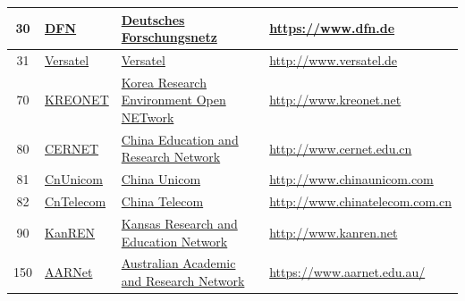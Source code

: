 \begin{small}
\begin{center}
\begin{longtable}{|c|c|c|c|}
 30 & \multicolumn{1}{|l|}{\index{DFN|see{Deutsches Forschungsnetz}}\index{Provider!Deutsches Forschungsnetz}\href{https://www.dfn.de}{DFN}} & \multicolumn{1}{|l|}{\index{Deutsches Forschungsnetz}\href{https://www.dfn.de}{Deutsches Forschungsnetz}} & \multicolumn{1}{|l|}{\tiny{\url{https://www.dfn.de}}} \\ \hline
 31 & \multicolumn{1}{|l|}{\index{Versatel}\index{Provider!Versatel}\href{http://www.versatel.de}{Versatel}} & \multicolumn{1}{|l|}{\index{Versatel}\href{http://www.versatel.de}{Versatel}} & \multicolumn{1}{|l|}{\tiny{\url{http://www.versatel.de}}} \\ \hline
 70 & \multicolumn{1}{|l|}{\index{KREONET|see{Korea Research Environment Open NETwork}}\index{Provider!Korea Research Environment Open NETwork}\href{http://www.kreonet.net}{KREONET}} & \multicolumn{1}{|l|}{\index{Korea Research Environment Open NETwork}\href{http://www.kreonet.net}{Korea Research Environment Open NETwork}} & \multicolumn{1}{|l|}{\tiny{\url{http://www.kreonet.net}}} \\ \hline
 80 & \multicolumn{1}{|l|}{\index{CERNET|see{China Education and Research Network}}\index{Provider!China Education and Research Network}\href{http://www.cernet.edu.cn}{CERNET}} & \multicolumn{1}{|l|}{\index{China Education and Research Network}\href{http://www.cernet.edu.cn}{China Education and Research Network}} & \multicolumn{1}{|l|}{\tiny{\url{http://www.cernet.edu.cn}}} \\ \hline
 81 & \multicolumn{1}{|l|}{\index{CnUnicom|see{China Unicom}}\index{Provider!China Unicom}\href{http://www.chinaunicom.com}{CnUnicom}} & \multicolumn{1}{|l|}{\index{China Unicom}\href{http://www.chinaunicom.com}{China Unicom}} & \multicolumn{1}{|l|}{\tiny{\url{http://www.chinaunicom.com}}} \\ \hline
 82 & \multicolumn{1}{|l|}{\index{CnTelecom|see{China Telecom}}\index{Provider!China Telecom}\href{http://www.chinatelecom.com.cn}{CnTelecom}} & \multicolumn{1}{|l|}{\index{China Telecom}\href{http://www.chinatelecom.com.cn}{China Telecom}} & \multicolumn{1}{|l|}{\tiny{\url{http://www.chinatelecom.com.cn}}} \\ \hline
 90 & \multicolumn{1}{|l|}{\index{KanREN|see{Kansas Research and Education Network}}\index{Provider!Kansas Research and Education Network}\href{http://www.kanren.net}{KanREN}} & \multicolumn{1}{|l|}{\index{Kansas Research and Education Network}\href{http://www.kanren.net}{Kansas Research and Education Network}} & \multicolumn{1}{|l|}{\tiny{\url{http://www.kanren.net}}} \\ \hline
 150 & \multicolumn{1}{|l|}{\index{AARNet|see{Australian Academic and Research Network}}\index{Provider!Australian Academic and Research Network}\href{https://www.aarnet.edu.au/}{AARNet}} & \multicolumn{1}{|l|}{\index{Australian Academic and Research Network}\href{https://www.aarnet.edu.au/}{Australian Academic and Research Network}} & \multicolumn{1}{|l|}{\tiny{\url{https://www.aarnet.edu.au/}}} \\ \hline
\end{longtable}
\end{center}
\end{small}
